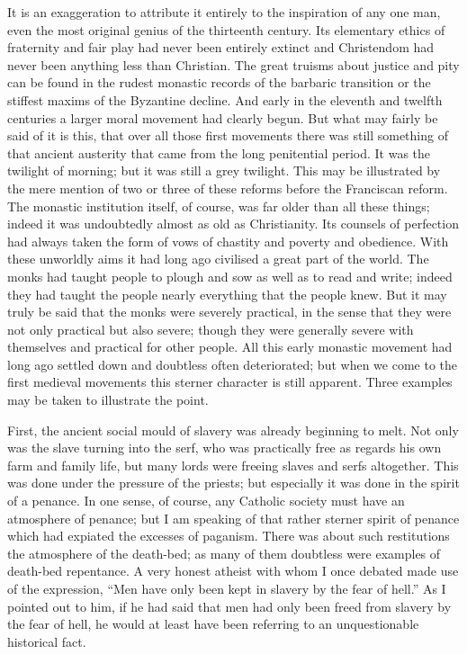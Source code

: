 \documentclass{book}
\begin{document}
It is an exaggeration to attribute it entirely to the inspiration of any one man, even the most original genius of the thirteenth century. Its elementary ethics of fraternity and fair play had never been entirely extinct and Christendom had never been anything less than Christian. The great truisms about justice and pity can be found in the rudest monastic records of the barbaric transition or the stiffest maxims of the Byzantine decline. And early in the eleventh and twelfth centuries a larger moral movement had clearly begun. But what may fairly be said of it is this, that over all those first movements there was still something of that ancient austerity that came from the long penitential period. It was the twilight of morning; but it was still a grey twilight. This may be illustrated by the mere mention of two or three of these reforms before the Franciscan reform. The monastic institution itself, of course, was far older than all these things; indeed it was undoubtedly almost as old as Christianity. Its counsels of perfection had always taken the form of vows of chastity and poverty and obedience. With these unworldly aims it had long ago civilised a great part of the world. The monks had taught people to plough and sow as well as to read and write; indeed they had taught the people nearly everything that the people knew. But it may truly be said that the monks were severely practical, in the sense that they were not only practical but also severe; though they were generally severe with themselves and practical for other people. All this early monastic movement had long ago settled down and doubtless often deteriorated; but when we come to the first medieval movements this sterner character is still apparent. Three examples may be taken to illustrate the point.

First, the ancient social mould of slavery was already beginning to melt. Not only was the slave turning into the serf, who was practically free as regards his own farm and family life, but many lords were freeing slaves and serfs altogether. This was done under the pressure of the priests; but especially it was done in the spirit of a penance. In one sense, of course, any Catholic society must have an atmosphere of penance; but I am speaking of that rather sterner spirit of penance which had expiated the excesses of paganism. There was about such restitutions the atmosphere of the death-bed; as many of them doubtless were examples of death-bed repentance. A very honest atheist with whom I once debated made use of the expression, “Men have only been kept in slavery by the fear of hell.” As I pointed out to him, if he had said that men had only been freed from slavery by the fear of hell, he would at least have been referring to an unquestionable historical fact.
\end{document}
